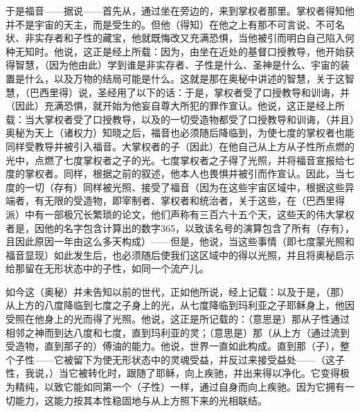 于是福音——据说——首先从，通过坐在旁边的，来到掌权者那里。掌权者得知他并不是宇宙的天主，而是受生的。但他（得知）在他之上有那不可言说、不可名状、非实存者和子性的藏宝，他就既悔改又充满恐惧，当他被引而明白自己陷入何种无知时。他说，这正是经上所载：因为，由坐在近处的基督口授教导，他开始获得智慧，（因为他由此）学到谁是非实存者、子性是什么、圣神是什么、宇宙的装置是什么，以及万物的结局可能是什么。这就是那在奥秘中讲述的智慧，关于这智慧，（巴西里得）说，圣经用了以下的话：于是，掌权者受了口授教导和训诲，并（因此）充满恐惧，就开始为他妄自尊大所犯的罪作宣认。他说，这正是经上所载：当大掌权者受了口授教导，以及的一切受造物都受了口授教导和训诲，（并且）奥秘为天上（诸权力）知晓之后，福音也必须随后降临到，为使七度的掌权者也能同样受教导并被引入福音。大掌权者的子（因此）在他自己从上方从子性所点燃的光中，点燃了七度掌权者之子的光。七度掌权者之子得了光照，并将福音宣报给七度的掌权者。同样，根据之前的叙述，他本人也畏惧并被引而作宣认。因此，当七度的一切（存有）同样被光照、接受了福音（因为在这些宇宙区域中，根据这些异端者，有无限的受造物，即宰制者、掌权者和统治者，关于这些，在（巴西里得派）中有一部极冗长繁琐的论文，他们声称有三百六十五个天，这些天的伟大掌权者是，因他的名字包含计算出的数字365，以致该名号的演算包含了所有（存有），且因此原因一年由这么多天构成）——但是，他说，当这些事情（即七度蒙光照和福音显现）如此发生后，也必须随后使我们这区域中的得以光照，并且将奥秘启示给那留在无形状态中的子性，如同一个流产儿。\par

如今这（奥秘）并未告知以前的世代，正如他所说，经上记载：以及于是，（那）从上方的八度降临到七度之子身上的光，从七度降临到玛利亚之子耶稣身上，他因受照在他身上的光而得了光照。他说，这正是所记载的：（意思是）那从子性通过相邻之神而到达八度和七度，直到玛利亚的灵；（意思是）那（从上方（通过流到受造物，直到那子的）傅油的能力。他说，世界一直如此构成。直到那（子），整个子性——它被留下为使无形状态中的灵魂受益，并反过来接受益处——（这子性，我说，）当它被转化时，跟随了耶稣，向上疾驰，并出来得以净化。它变得极为精纯，以致它能如同第一个（子性）一样，通过自身而向上疾驰。因为它拥有一切能力，这能力按其本性稳固地与从上方照下来的光相联结。\par

